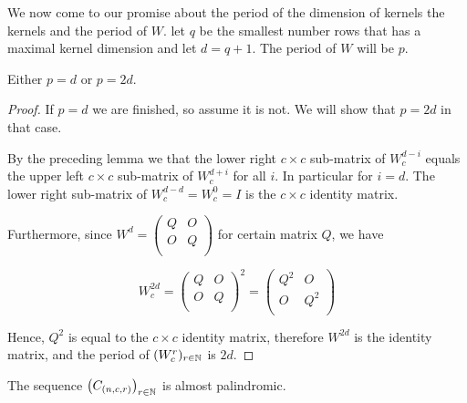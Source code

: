 We now come to our promise about the period of the dimension of kernels the
kernels and the period of $W$. let $q$ be the smallest number rows that has a
maximal kernel dimension and let $d = q+1$. The period of $W$ will be $p$.

\begin{lemma}
  Either $p=d$ or $p=2d$.
\end{lemma}

\begin{proof}
  If $p=d$ we are finished, so assume it is not. We will show that $p=2d$ in
  that case.

  By the preceding lemma we that the lower right $c\times c$ sub-matrix of
  $W_{c}^{d-i}$ equals the upper left $c\times c$ sub-matrix of $W_{c}^{d+i}$
  for all $i$. In particular for $i=d$. The lower right sub-matrix of
  $W_{c}^{d-d} = W_{c}^{0} = I$ is the $c\times c$ identity matrix.

  Furthermore, since $W^{d}=\left(\begin{smallmatrix} Q & O \\ O & Q \\\end{smallmatrix}\right)$
  for certain matrix $Q$, we have

  \[
  W_{c}^{2d}
  =
  \left(
  \begin{array}{cc}
    Q & O \\
    O & Q \\
  \end{array}
  \right)^{2}
  =
  \left(
  \begin{array}{cc}
    Q^{2} & O \\
    O & Q^{2} \\
  \end{array}
  \right)
  \]

  Hence, $Q^{2}$ is equal to the $c\times c$ identity matrix, therefore $W^{2d}$
  is the identity matrix, and the period of $(W_{c}^{r})_{r\in\mathbb{N}}$ is $2d$.
\end{proof}

\begin{theorem}
  The sequence $\left(C_{(n,c,r)}\right)_{r\in\mathbb{N}}$
  is almost palindromic.
\end{theorem}

